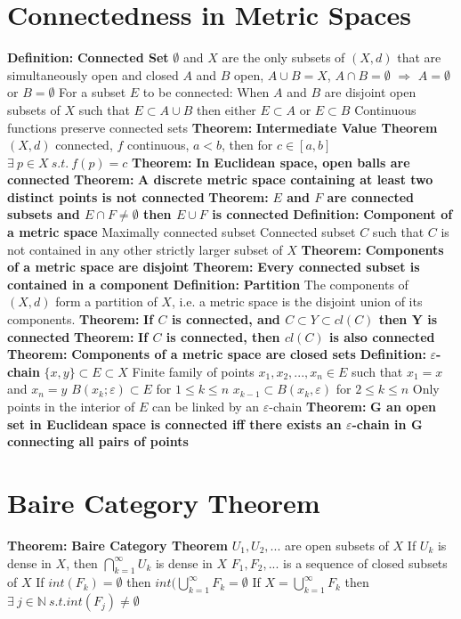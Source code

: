 \documentclass[14pt]{extarticle}
\def\Definition{{\color{Blue} \textbf{Definition:} }}
\def\Theorem{{\color{Red} \textbf{Theorem:} }}
\begin{document}
\begin{outline}
		\section{Connectedness in Metric Spaces}
		\1	\Definition \textbf{Connected Set}
			\2	$\emptyset$ and $X$ are the only subsets of $(X,d)$ that are simultaneously
					open and closed
			\2	$A$ and $B$ open, $A \cup B = X$, $A \cap B = \emptyset$ $\Rightarrow$
					$A = \emptyset$ or $B = \emptyset$
			\2	For a subset $E$ to be connected: 
					When $A$ and $B$ are disjoint open subsets of $X$ such that $E \subset A \cup B$
					then either $E \subset A$ or $E \subset B$
			\2	Continuous functions preserve connected sets
		\1	\Theorem \textbf{Intermediate Value Theorem}
			\2	$(X,d)$ connected, $f$ continuous, $a < b$, then for $c \in [a,b]$
			$\exists~p \in X~s.t.~f(p) = c$
		\1	\Theorem	\textbf{In Euclidean space, open balls are connected}
		\1	\Theorem	\textbf{A discrete metric space containing at least two
				distinct points is not connected}
		\1	\Theorem \textbf{$E$ and $F$ are connected subsets and $E \cap F \ne \emptyset$
						then $E \cup F$ is connected}
		\1	\Definition \textbf{Component of a metric space}
			\2	Maximally connected subset
			\2	Connected subset $C$ such that $C$ is not contained in any other 
					strictly larger subset of $X$
		\1	\Theorem	\textbf{Components of a metric space are disjoint}
		\1	\Theorem	\textbf{Every connected subset is contained in a component}
		\1	\Definition \textbf{Partition}
			\2	The components of $(X,d)$ form a partition of $X$, i.e. a metric space
					is the disjoint union of its components.
		\1	\Theorem \textbf{If $C$ is connected, and $C \subset Y \subset cl(C)$ then Y is connected}
		\1	\Theorem	\textbf{If $C$ is connected, then $cl(C)$ is also connected}
		\1	\Theorem	\textbf{Components of a metric space are closed sets}
		\1	\Definition \textbf{$\varepsilon$-chain}
			\2	$\{x,y\}\subset E \subset X$
			\2	Finite family of points $x_1,x_2,...,x_n \in E$ such that
				\3	$x_1 = x$ and $x_n = y$
				\3	$B(x_k;\varepsilon) \subset E$ for $1 \le k \le n$
				\3	$x_{k-1} \subset B(x_k,\varepsilon)$ for $2 \le k \le n$
			\2	Only points in the interior of $E$ can be linked by an $\varepsilon$-chain
		\1	\Theorem	\textbf{G an open set in Euclidean space is connected iff 
					there exists an $\varepsilon$-chain in G connecting all pairs of points}
		\section{Baire Category Theorem}
		\1	\Theorem	\textbf{Baire Category Theorem}
			\2	$U_1,U_2,...$ are open subsets of $X$
			\2	If $U_k$ is dense in $X$, then $\bigcap_{k=1}^{\infty} U_k$ is dense in $X$
			\2	$F_1,F_2,...$ is a sequence of closed subsets of $X$
			\2	If $int(F_k) = \emptyset$ then $int(\bigcup_{k=1}^{\infty} F_k = \emptyset$
			\2	If $X = \bigcup_{k=1}^{\infty} F_k$ then $\exists~j \in \mathbb{N}~s.t. int(F_j) \ne \emptyset$
	\end{outline}
\end{document}
